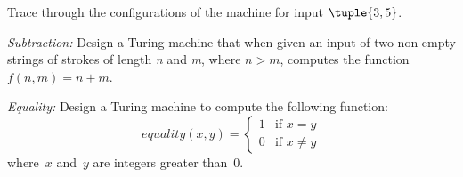\documentclass[../../../include/open-logic-section]{subfiles}
\begin{document}
\begin{prob}
Trace through the configurations of the machine for input $\tuple{3,5}$.
\end{prob}

\begin{prob}
\emph{Subtraction:} Design a Turing machine that when given an input of two non-empty 
strings of strokes of length \emph{n} and \emph{m}, where $n > m$, computes the 
function $f(n,m) = n + m$. 
\end{prob}

\begin{prob}
\emph{Equality:} Design a Turing machine to compute the following function:
\[
equality(x,y) = 
\begin{cases}
  \text{1} & \text{if~$x = y$} \\
  \text{0} & \text{if~$x \neq y$}
\end{cases}
\]
where~$x$ and~$y$ are integers greater than~$0$.
\end{prob}
\end{document}
